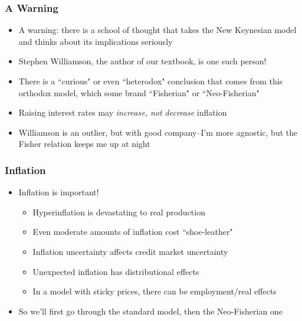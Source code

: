 \documentclass{beamer}
\author{Trevor S. Gallen}
\date{}
\begin{document}
\renewcommand*{\inserttotalframenumber}{\pageref{lastframe}}



\begin{frame}
\titlepage
\end{frame}

\begin{frame}
\frametitle[alignment=center]{A Warning}
\begin{itemize}
\item A warning: there is a school of thought that takes the New Keynesian model and thinks about its implications seriously
\bigskip
\item Stephen Williamson, the author of our textbook, is one such person!
\bigskip
\item There is a ``curious" or even ``heterodox" conclusion that comes from this orthodox model, which some brand ``Fisherian" or ``Neo-Fisherian"
\bigskip
\item Raising interest rates may \emph{increase, not decrease} inflation
\bigskip
\item Williamson is an outlier, but with good company--I'm more agnostic, but the Fisher relation keeps me up at night
\end{itemize}
\end{frame}

\begin{frame}
\frametitle[alignment=center]{Inflation}
\begin{itemize}
\item Inflation is important!  
\begin{itemize}
\item Hyperinflation is devastating to real production
\bigskip
\item Even moderate amounts of inflation cost ``shoe-leather"
\bigskip
\item Inflation uncertainty affects credit market uncertainty
\bigskip
\item Unexpected inflation has distributional effects
\bigskip
\item In a model with sticky prices, there can be employment/real effects
\end{itemize}
\item So we'll first go through the standard model, then the Neo-Fisherian one
\end{itemize}
\end{frame}
\end{document}
